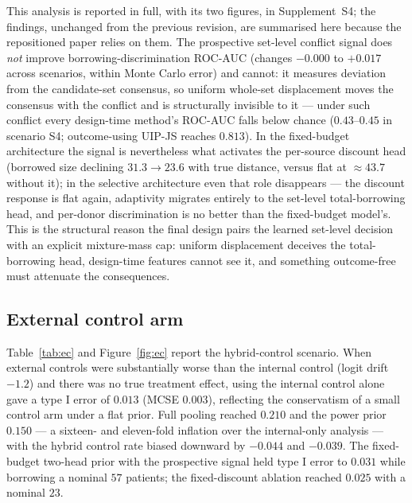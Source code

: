 \documentclass[11pt]{article}
\begin{document}
This analysis is reported in full, with its two figures, in
Supplement~S4; the findings, unchanged from the previous revision, are
summarised here because the repositioned paper relies on them. The
prospective set-level conflict signal does \emph{not} improve
borrowing-discrimination ROC-AUC (changes $-0.000$ to $+0.017$ across
scenarios, within Monte Carlo error) and cannot: it measures deviation
from the candidate-set consensus, so uniform whole-set displacement moves
the consensus with the conflict and is structurally invisible to it ---
under such conflict every design-time method's ROC-AUC falls below chance
($0.43$--$0.45$ in scenario S4; outcome-using UIP-JS reaches $0.813$). In
the fixed-budget architecture the signal is nevertheless what activates
the per-source discount head (borrowed size declining $31.3 \to 23.6$
with true distance, versus flat at $\approx 43.7$ without it); in the
selective architecture even that role disappears --- the discount
response is flat again, adaptivity migrates entirely to the set-level
total-borrowing head, and per-donor discrimination is no better than the
fixed-budget model's. This is the structural reason the final design
pairs the learned set-level decision with an explicit mixture-mass cap:
uniform displacement deceives the total-borrowing head, design-time
features cannot see it, and something outcome-free must attenuate the
consequences.

\subsection{External control arm}
\label{sec:ec-results}

Table~\ref{tab:ec} and Figure~\ref{fig:ec} report the hybrid-control scenario.
When external controls were substantially worse than the internal control
(logit drift $-1.2$) and there was no true treatment effect, using the internal
control alone gave a type I error of $0.013$ (MCSE $0.003$), reflecting the
conservatism of a small control arm under a flat prior. Full pooling reached
$0.210$ and the power prior $0.150$ --- a sixteen- and eleven-fold inflation
over the internal-only analysis --- with the hybrid
control rate biased downward by $-0.044$ and $-0.039$. The fixed-budget
two-head prior with
the prospective signal held type I error to $0.031$ while borrowing a nominal
$57$ patients; the fixed-discount ablation reached $0.025$ with a nominal $23$.
\end{document}
